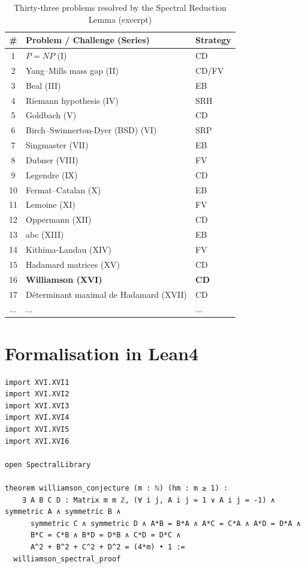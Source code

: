 \documentclass[11pt,a4paper]{article}
\begin{document}
\begin{center}
\small
\begin{longtable}{@{}cll@{}}
\caption{Thirty‑three problems resolved by the Spectral Reduction Lemma (excerpt)}\\
\toprule
\# & Problem / Challenge (Series) & Strategy \\
\midrule
1 & \(P = NP\) (I) & CD \\
2 & Yang–Mills mass gap (II) & CD/FV \\
3 & Beal (III) & EB \\
4 & Riemann hypothesis (IV) & SRH \\
5 & Goldbach (V) & CD \\
6 & Birch–Swinnerton-Dyer (BSD) (VI) & SRP \\
7 & Singmaster (VII) & EB \\
8 & Dubner (VIII) & FV \\
9 & Legendre (IX) & CD \\
10 & Fermat–Catalan (X) & EB \\
11 & Lemoine (XI) & FV \\
12 & Oppermann (XII) & CD \\
13 & abc (XIII) & EB \\
14 & Kithima‑Landau (XIV) & FV \\
15 & Hadamard matrices (XV) & CD \\
16 & \textbf{Williamson (XVI)} & \textbf{CD} \\
17 & Déterminant maximal de Hadamard (XVII) & CD \\
... & ... & ... \\
\bottomrule
\end{longtable}
\end{center}

\section{Formalisation in Lean4}

\begin{lstlisting}[style=lean, caption={MainXVI.lean (final)}]
import XVI.XVI1
import XVI.XVI2
import XVI.XVI3
import XVI.XVI4
import XVI.XVI5
import XVI.XVI6

open SpectralLibrary

theorem williamson_conjecture (m : ℕ) (hm : m ≥ 1) :
    ∃ A B C D : Matrix m m ℤ, (∀ i j, A i j = 1 ∨ A i j = -1) ∧ symmetric A ∧ symmetric B ∧
      symmetric C ∧ symmetric D ∧ A*B = B*A ∧ A*C = C*A ∧ A*D = D*A ∧
      B*C = C*B ∧ B*D = D*B ∧ C*D = D*C ∧
      A^2 + B^2 + C^2 + D^2 = (4*m) • 1 :=
  williamson_spectral_proof
\end{lstlisting}
\end{document}
